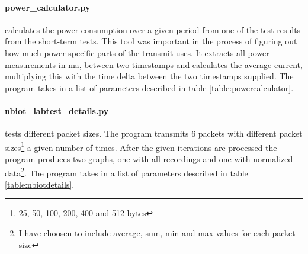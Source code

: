 \documentclass[USenglish]{ifimaster}  %
\begin{document}
\paragraph{\textbf{power\_calculator.py}} calculates the power consumption over a given period from one of the test results from the short-term tests. This tool was important in the process of figuring out how much power specific parts of the transmit uses. It extracts all power measurements in \acrshort{ma}, between two timestamps and calculates the average current, multiplying this with the time delta between the two timestamps supplied. The program takes in a list of parameters described in table \vref{table:powercalculator}.

\begin{table}[H]
\centering
{}
\caption[\textbf{power\_calculator.py} parameters]{\textbf{power\_calculator.py} parameters. See \href{https://github.com/henninghaakonsen/thesis/blob/master/code/power_calculator.py}{power calculator}\cite{code:powercalc} for complete code}
\label{table:powercalculator}
\end{table}

\paragraph{\textbf{nbiot\_labtest\_details.py}} tests different packet sizes. The program transmits 6 packets with different packet sizes\footnote{25, 50, 100, 200, 400 and 512 bytes} a given number of times. After the given iterations are processed the program produces two graphs, one with all recordings and one with normalized data\footnote{I have choosen to include average, sum, min and max values for each packet size}. The program takes in a list of parameters described in table \vref{table:nbiotdetails}.
\end{document}
